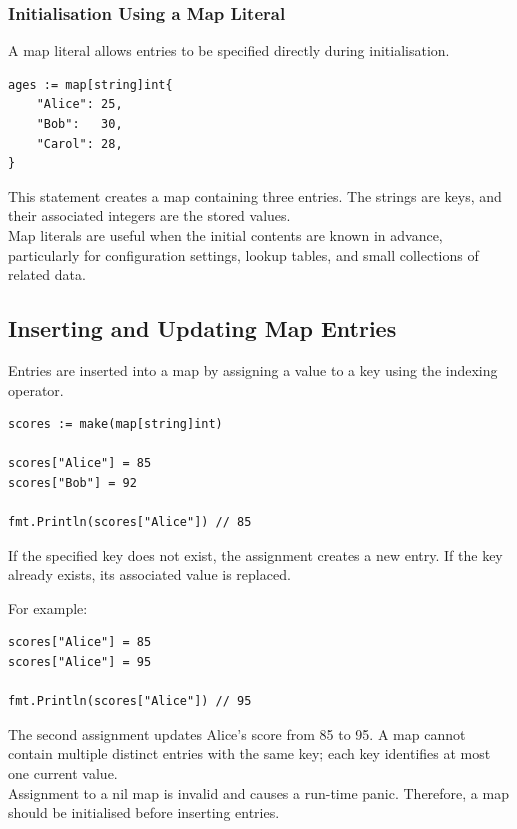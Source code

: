 \subsubsection{Initialisation Using a Map Literal}

A map literal allows entries to be specified directly
during initialisation.

\begin{lstlisting}
ages := map[string]int{
    "Alice": 25,
    "Bob":   30,
    "Carol": 28,
}
\end{lstlisting}

This statement creates a map containing three entries.
The strings are keys, and their associated integers are
the stored values.\\

Map literals are useful when the initial contents are known
in advance, particularly for configuration settings,
lookup tables, and small collections of related data.

\subsection{Inserting and Updating Map Entries}

Entries are inserted into a map by assigning a value to a
key using the indexing operator.

\begin{lstlisting}
scores := make(map[string]int)

scores["Alice"] = 85
scores["Bob"] = 92

fmt.Println(scores["Alice"]) // 85
\end{lstlisting}

If the specified key does not exist, the assignment creates
a new entry. If the key already exists, its associated
value is replaced.

For example:

\begin{lstlisting}
scores["Alice"] = 85
scores["Alice"] = 95

fmt.Println(scores["Alice"]) // 95
\end{lstlisting}

The second assignment updates Alice's score from 85 to 95.
A map cannot contain multiple distinct entries with the
same key; each key identifies at most one current value.\\

Assignment to a nil map is invalid and causes a run-time
panic. Therefore, a map should be initialised before
inserting entries.

